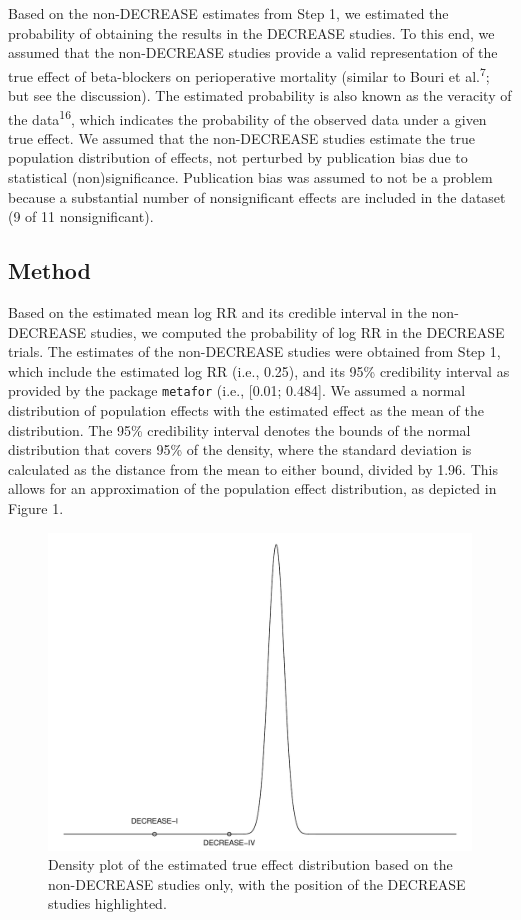 \documentclass[]{article}
\begin{document}
Based on the non-DECREASE estimates from Step 1, we estimated the
probability of obtaining the results in the DECREASE studies. To this
end, we assumed that the non-DECREASE studies provide a valid
representation of the true effect of beta-blockers on perioperative
mortality (similar to Bouri et al.\textsuperscript{7}; but see the
discussion). The estimated probability is also known as the veracity of
the data\textsuperscript{16}, which indicates the probability of the
observed data under a given true effect. We assumed that the
non-DECREASE studies estimate the true population distribution of
effects, not perturbed by publication bias due to statistical
(non)significance. Publication bias was assumed to not be a problem
because a substantial number of nonsignificant effects are included in
the dataset (9 of 11 nonsignificant).

\subsection{Method}\label{method}

Based on the estimated mean log RR and its credible interval in the
non-DECREASE studies, we computed the probability of log RR in the
DECREASE trials. The estimates of the non-DECREASE studies were obtained
from Step 1, which include the estimated log RR (i.e., 0.25), and its
95\% credibility interval as provided by the package \texttt{metafor}
(i.e., {[}0.01; 0.484{]}. We assumed a normal distribution of population
effects with the estimated effect as the mean of the distribution. The
95\% credibility interval denotes the bounds of the normal distribution
that covers 95\% of the density, where the standard deviation is
calculated as the distance from the mean to either bound, divided by
1.96. This allows for an approximation of the population effect
distribution, as depicted in Figure 1.

\begin{figure}

{\centering \includegraphics[width=0.8\linewidth]{../figures/fig1} 

}

\caption{Density plot of the estimated true effect distribution based on the non-DECREASE studies only, with the position of the DECREASE studies highlighted.}\label{fig:figure 1}
\end{figure}
\end{document}
